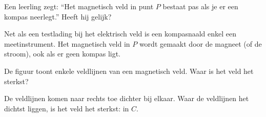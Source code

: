 \documentclass{ximera}
\begin{document}
\begin{question}
    Een leerling zegt: \enquote{Het magnetisch veld in punt $P$ bestaat pas als je er een kompas neerlegt.} Heeft hij gelijk?

    \begin{multipleChoice}
    \end{multipleChoice}

    \begin{solution}\nl
        Net als een testlading bij het elektrisch veld is een kompasnaald enkel een meetinstrument. Het magnetisch veld in $P$ wordt gemaakt door de magneet (of de stroom), ook als er geen kompas ligt.
    \end{solution}
\end{question}

\begin{question}
    De figuur toont enkele veldlijnen van een magnetisch veld. Waar is het veld het sterkst?

    \begin{center}
    \end{center}

    \begin{multipleChoice}
    \end{multipleChoice}

    \begin{solution}\nl
        De veldlijnen komen naar rechts toe dichter bij elkaar. Waar de veldlijnen het dichtst liggen, is het veld het sterkst: in $C$.
    \end{solution}
\end{question}
\end{document}
